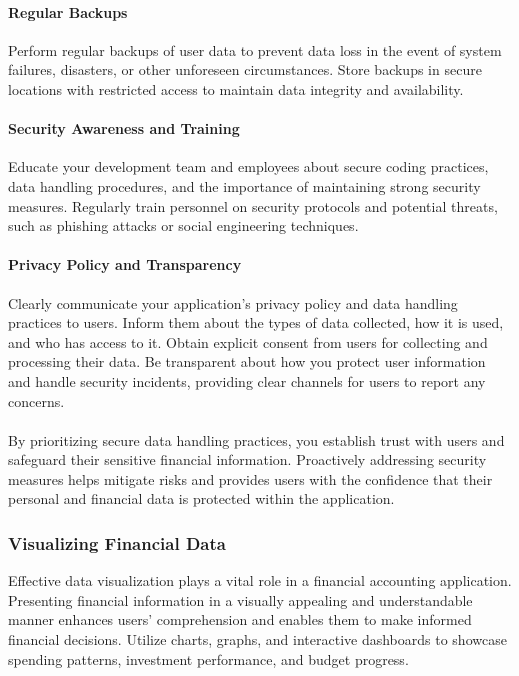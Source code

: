 \paragraph{Regular Backups}
Perform regular backups of user data to prevent data loss in the event of system failures, 
disasters, or other unforeseen circumstances. Store backups in secure locations with restricted access to 
maintain data integrity and availability.

\paragraph{Security Awareness and Training}
Educate your development team and employees about secure coding practices, data 
handling procedures, and the importance of maintaining strong security measures. Regularly train personnel on 
security protocols and potential threats, such as phishing attacks or social engineering techniques.

\paragraph{Privacy Policy and Transparency}
Clearly communicate your application's privacy policy and data handling practices to 
users. Inform them about the types of data collected, how it is used, and who has access to it. Obtain explicit 
consent from users for collecting and processing their data. Be transparent about how you protect user information 
and handle security incidents, providing clear channels for users to report any concerns.
\\
\\
By prioritizing secure data handling practices, you establish trust with users and safeguard their sensitive 
financial information. Proactively addressing security measures helps mitigate risks and provides users with 
the confidence that their personal and financial data is protected within the application.


\subsubsection{Visualizing Financial Data}
Effective data visualization plays a vital role in a financial accounting application. Presenting financial 
information in a visually appealing and understandable manner enhances users' comprehension and enables them 
to make informed financial decisions. Utilize charts, graphs, and interactive dashboards to showcase spending 
patterns, investment performance, and budget progress.

